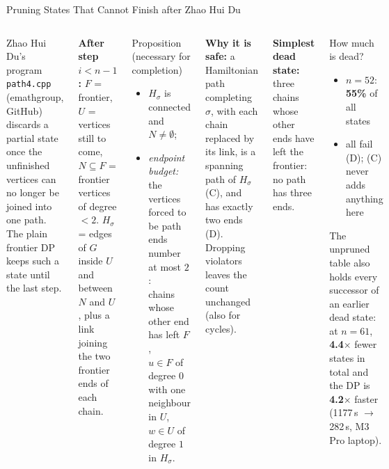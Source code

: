 \documentclass[aspectratio=169,t]{beamer}
\begin{document}
\begin{frame}{Pruning States That Cannot Finish \hfill{\normalsize after Zhao Hui Du}}
\footnotesize
\begin{columns}[t]
Zhao Hui Du's program \texttt{path4.cpp} (emathgroup, GitHub) discards a
partial state once the unfinished vertices can no longer be joined into
one path. The plain frontier DP keeps such a state until the last step.

\vspace{0.1cm}
\textbf{After step $i<n-1$:} $F$ = frontier, $U$ = vertices still to
come, $N\subseteq F$ = frontier vertices of degree $<2$.
$H_\sigma$ = edges of $G$ inside $U$ and between $N$ and $U$, plus a link
joining the two frontier ends of each chain.

\vspace{0.1cm}
\begin{block}{Proposition (necessary for completion)}
\begin{itemize}
  \item[(C)] $H_\sigma$ is connected and $N\neq\emptyset$;
  \item[(D)] \emph{endpoint budget:} the vertices forced to be path ends
    number at most $2$:\\
    chains whose other end has left $F$,\\
    $u\in F$ of degree $0$ with one neighbour in $U$,\\
    $w\in U$ of degree $1$ in $H_\sigma$.
\end{itemize}
\end{block}

\textbf{Why it is safe:} a Hamiltonian path completing $\sigma$, with each
chain replaced by its link, is a spanning path of $H_\sigma$ (C), and has
exactly two ends (D). Dropping violators leaves the count unchanged
(also for cycles).

\vspace{0.15cm}
\textbf{Simplest dead state:} three chains whose other ends have left the
frontier: no path has three ends.

\vspace{0.15cm}
\begin{exampleblock}{How much is dead?}
\begin{itemize}
  \item $n=52$: \textbf{55\%} of all states
  \item all fail (D); (C) never adds anything here
\end{itemize}
The unpruned table also holds every successor of an earlier dead state:
at $n=61$, \textbf{4.4$\times$} fewer states in total and the DP is
\textbf{4.2$\times$} faster (1177\,s $\to$ 282\,s, M3 Pro laptop).
\end{exampleblock}
\end{columns}
\end{frame}
\end{document}
